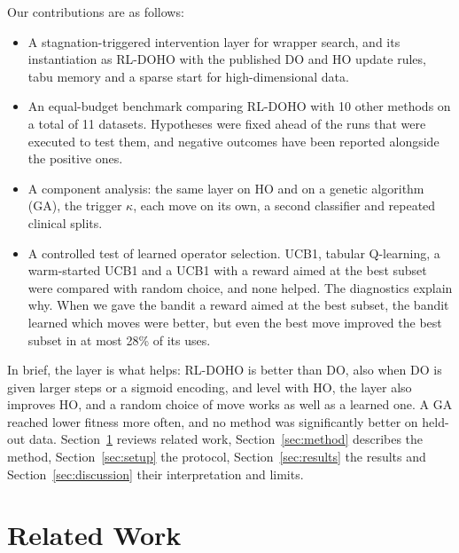 \documentclass[pdflatex,sn-basic]{sn-jnl}
\begin{document}
Our contributions are as follows:
\begin{itemize}
\item A stagnation-triggered intervention layer for wrapper search, and its instantiation as RL-DOHO with the published DO and HO update rules, tabu memory and a sparse start for high-dimensional data.
\item An equal-budget benchmark comparing RL-DOHO with 10 other methods on a total of 11 datasets. Hypotheses were fixed ahead of the runs that were executed to test them, and negative outcomes have been reported alongside the positive ones.
\item A component analysis: the same layer on HO and on a genetic algorithm (GA), the trigger $\kappa$, each move on its own, a second classifier and repeated clinical splits.
\item A controlled test of learned operator selection. UCB1, tabular Q-learning, a warm-started UCB1 and a UCB1 with a reward aimed at the best subset were compared with random choice, and none helped. The diagnostics explain why. When we gave the bandit a reward aimed at the best subset, the bandit learned which moves were better, but even the best move improved the best subset in at most 28\% of its uses.
\end{itemize}

In brief, the layer is what helps: RL-DOHO is better than DO, also when DO is given larger steps or a sigmoid encoding, and level with HO, the layer also improves HO, and a random choice of move works as well as a learned one. A GA reached lower fitness more often, and no method was significantly better on held-out data. Section~\ref{sec:related} reviews related work, Section~\ref{sec:method} describes the method, Section~\ref{sec:setup} the protocol, Section~\ref{sec:results} the results and Section~\ref{sec:discussion} their interpretation and limits.


\section{Related Work}\label{sec:related}
\end{document}

